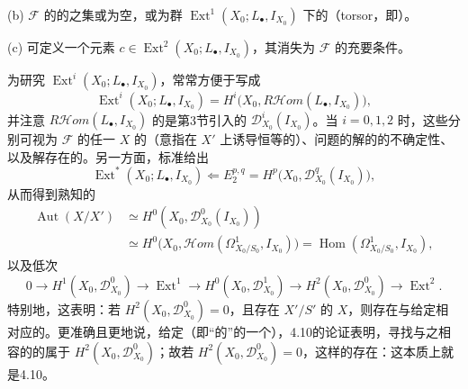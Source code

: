 (b) $\mathcal F$ 的的之集或为空，或为群 $\operatorname{Ext}^1(X_0;L_\bullet,I_{X_0})$ 下的（torsor，即）。

(c) 可定义一个元素 $c\in\operatorname{Ext}^2(X_0;L_\bullet,I_{X_0})$，其消失为 $\mathcal F$ 的充要条件。

为研究 $\operatorname{Ext}^i(X_0;L_\bullet,I_{X_0})$，常常方便于写成
\[
\operatorname{Ext}^i(X_0;L_\bullet,I_{X_0})
=H^i\bigl(X_0,R\mathcal Hom(L_\bullet,I_{X_0})\bigr),
\]
并注意 $R\mathcal Hom(L_\bullet,I_{X_0})$ 的是第3节引入的 $\mathcal D^i_{X_0}(I_{X_0})$。当 $i=0,1,2$ 时，这些分别可视为 $\mathcal F$ 的任一 $X$ 的（意指在 $X'$ 上诱导恒等的）、问题的解的的不确定性、以及解存在的。另一方面，标准给出
\[
\operatorname{Ext}^*(X_0;L_\bullet,I_{X_0})\Longleftarrow
E_2^{p,q}=H^p\bigl(X_0,\mathcal D^q_{X_0}(I_{X_0})\bigr),
\]
从而得到熟知的
\[
\begin{aligned}
\operatorname{Aut}(X/X')&\simeq H^0(X_0,\mathcal D^0_{X_0}(I_{X_0}))\\
&\simeq H^0\bigl(X_0,\mathcal Hom(\Omega^1_{X_0/S_0},I_{X_0})\bigr)
=\operatorname{Hom}(\Omega^1_{X_0/S_0},I_{X_0}),
\end{aligned}
\]
以及低次
\[
0\longrightarrow H^1(X_0,\mathcal D^0_{X_0})\longrightarrow\operatorname{Ext}^1
\longrightarrow H^0(X_0,\mathcal D^1_{X_0})\longrightarrow H^2(X_0,\mathcal D^0_{X_0})
\longrightarrow\operatorname{Ext}^2.
\]
特别地，这表明：若 $H^2(X_0,\mathcal D^0_{X_0})=0$，且存在 $X'/S'$ 的 $X$，则存在与给定相对应的。更准确且更地说，给定（即“的”的一个），4.10的论证表明，寻找与之相容的的属于 $H^2(X_0,\mathcal D^0_{X_0})$；故若 $H^2(X_0,\mathcal D^0_{X_0})=0$，这样的存在：这本质上就是4.10。


